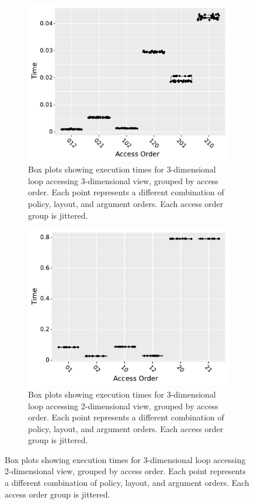 \documentclass[sigconf,review=true]{acmart}
\begin{document}
\begin{figure}
  \centering
  \begin{subfigure}{.48\textwidth}
	\includegraphics[width=\textwidth]{benchmark1_boxplot.pdf}
	\caption{Box plots showing execution times for 3-dimensional loop accessing 3-dimensional view, grouped by access order. Each point represents a different combination of policy, layout, and argument orders. Each access order group is jittered.}
	\label{AccessBenchmark1}
  \end{subfigure}
\begin{subfigure}{.48\textwidth}
	\includegraphics[width=\textwidth]{benchmark2_boxplot.pdf}
	\caption{Box plots showing execution times for 3-dimensional loop accessing 2-dimensional view, grouped by access order. Each point represents a different combination of policy, layout, and argument orders. Each access order group is jittered.}
	\label{AccessBenchmark2}
\end{subfigure}


\end{figure}
\end{document}
